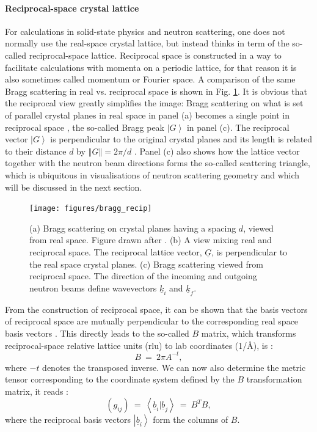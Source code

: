 \paragraph{Reciprocal-space crystal lattice}
For calculations in solid-state physics and neutron scattering, one does not normally use
the real-space crystal lattice, but instead thinks in term of the so-called reciprocal-space lattice.
Reciprocal space is constructed in a way to facilitate calculations with momenta on a periodic lattice,
for that reason it is also sometimes called momentum or Fourier space.
A comparison of the same Bragg scattering in real vs. reciprocal space is shown in Fig. \ref{fig:braggscattering_recip}.
It is obvious that the reciprocal view greatly simplifies the image: Bragg scattering on what is set of parallel
crystal planes in real space in panel (a) becomes a single point in reciprocal space \cite[p. 66]{Gross2012},
the so-called Bragg peak $\left| G \right>$ in panel (c). The reciprocal vector $\left| G \right>$ is
perpendicular to the original crystal planes and its length is related to their distance $d$ by
$\left\Vert G \right\Vert = 2\pi/d$ \cite[p. 66]{Gross2012}. Panel (c) also shows how the lattice vector
together with the neutron beam directions forms the so-called scattering triangle, which is 
ubiquitous in visualisations of neutron scattering geometry \cite[pp. 14-15]{Shirane2002} and which will be 
discussed in the next section.
\begin{figure}[htb]
	\centering
	\texttt{[image: figures/bragg\_recip]}
	\caption[Real and reciprocal lattice scattering.]{
		(a) Bragg scattering on crystal planes having a spacing $d$, viewed from real space.
			Figure drawn after \cite[p. 68, Fig. 2.7]{Gross2012}.
		(b) A view mixing real and reciprocal space. The reciprocal lattice vector, $\underline{G}$,
			is perpendicular to the real space crystal planes.
		(c) Bragg scattering viewed from reciprocal space. The direction of the incoming and outgoing
			neutron beams define wavevectors $\underline{k}_i$ and $\underline{k}_f$.}
	\label{fig:braggscattering_recip}
\end{figure}

From the construction of reciprocal space, it can be shown that the basis vectors of reciprocal space
are mutually perpendicular to the corresponding real space basis vectors \cite[p. 60]{Gross2012}.
This directly leads to the so-called $B$ matrix, which transforms reciprocal-space relative lattice units (rlu)
to lab coordinates (1/\AA), is \cite[p. 60]{Gross2012}:
\begin{equation} B \ =\  2 \pi A^{-t}, \end{equation}
where $-t$ denotes the transposed inverse.
We can now also determine the metric tensor \cite[pp. 807-809]{Arens2015} corresponding to the coordinate
system defined by the $B$ transformation matrix, it reads \cite[p. 808]{Arens2015}:
\begin{equation}
	\left(g_{ij}\right) \ =\  \left<\underline{b}_i | \underline{b}_j \right> \ =\  B^T B,
\end{equation}
where the reciprocal basis vectors $\left| \underline{b}_i \right>$ form the columns of $B$.

